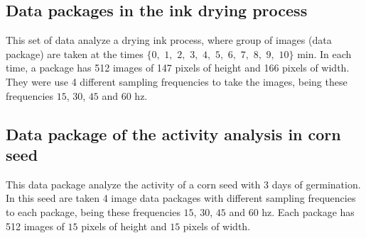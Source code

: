 \documentclass[review]{elsarticle}
\begin{document}
\subsection{Data packages in the ink drying process}
\label{subsec:data1}
 This set of data  analyze a drying ink process, 
 where group of images (data package) are taken at the times
 $\{0,$ $1,$ $2,$ $3,$ $4,$ $5,$ $6,$ $7,$ $8,$ $9,$ $10\}$ min. 
 In each time, a package
 has 512 images of 147 pixels of height and 166 pixels of width.
 They were use 4 different sampling frequencies to take the images,
 being these frequencies $15$, $30$, $45$ and $60$ hz.

\subsection{Data package of the activity analysis in corn seed}
\label{subsec:data2}
 This data package analyze the activity of a corn seed with 3 days of germination. 
 In this seed are taken 4 image data packages with different sampling frequencies to each package,
 being these frequencies $15$, $30$, $45$ and $60$ hz.
 Each package has 512 images of $15$ pixels of height and $15$ pixels of width.
 
\end{document}
